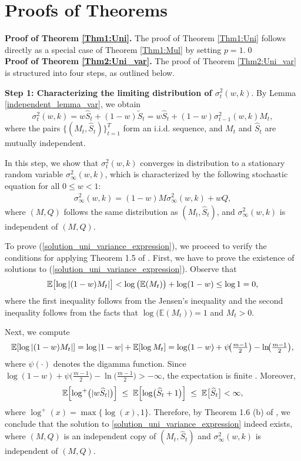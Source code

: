 \section{Proofs of Theorems}
\textbf{Proof of Theorem \ref{Thm1:Uni}.} The proof of Theorem \ref{Thm1:Uni} follows directly as a special case of Theorem \ref{Thm1:Mul} by setting $p=1$.\qed \\

\noindent
\textbf{Proof of Theorem \ref{Thm2:Uni_var}.} The proof of Theorem \ref{Thm2:Uni_var} is structured into four steps, as outlined below.

\noindent
\textbf{Step 1: Characterizing the limiting distribution of $\sigma_t^2(w,k)$}. By Lemma \ref{independent_lemma_var}, we obtain 
\[
\sigma_t^2(w,k) = w\widehat{S}_t + (1-w)\widetilde{S}_t = w\widehat{S}_t + (1-w)\sigma_{t-1}^2(w,k) M_t,
\]
where the pairs \(\{(M_t, \widehat{S}_t)\}_{t=1}^{T}\) form an i.i.d. sequence, and \(M_t\) and \(\widehat{S}_t\) are mutually independent.




In this step, we show that \(\sigma_t^2(w,k)\) converges in distribution to a stationary random variable \(\sigma_\infty^2(w,k)\), which is characterized by the following stochastic equation for all \(0 \leq w < 1\):
\begin{align}
\label{solution_uni_variance_expression}
\sigma_\infty^2(w,k) = (1-w)M\sigma_\infty^2(w,k) +wQ,
\end{align}
where \((M, Q)\) follows the same distribution as \((M_t, \widehat{S}_t)\), and \(\sigma_\infty^2(w,k)\) is independent of \((M, Q)\).

To prove (\ref{solution_uni_variance_expression}), we proceed to verify the conditions for applying Theorem 1.5 of \cite{vervaat1979stochastic}. First, we have to prove the existence of solutions to (\ref{solution_uni_variance_expression}). Observe that
\[
\mathbb{E}\bigl[\log \left\lvert (1-w)M_t\right\rvert\bigr] 
< 
\log \big(\mathbb{E}(M_t)\big) + \log (1-w) 
\leq
\log 1 
=
0,
\]
where the first inequality follows from the Jensen's inequality and the second inequality follows from the facts that $\log \bigl(\mathbb{E}(M_t)\bigr)=1$ and $M_t >0$.

Next, we compute
\[
\mathbb{E}[\log \left\lvert (1-w)M_t\right\rvert] = \log \left\lvert 1-w\right\rvert + \mathbb{E}[\log M_t] = \log (1-w) + \psi\!\bigl(\tfrac{m-1}{2}\bigr)
-
\ln\!\bigl(\tfrac{m-1}{2}\bigr),
\]
where \(\psi(\cdot)\) denotes the digamma function. Since \(\log (1-w) + \psi\bigl(\tfrac{m-1}{2}\bigr) - \ln\bigl(\tfrac{m-1}{2}\bigr) > -\infty\), the expectation is finite \citep{lee1989bayesian}. Moreover,
\[
\mathbb{E}\Bigl[\log^{+}\bigl(|w\widehat{S}_t|\bigr)\Bigr]
\;\le\;
\mathbb{E}\Bigl[\log\bigl(\widehat{S}_t + 1\bigr)\Bigr]
\;\le\;
\mathbb{E}\bigl[\widehat{S}_t\bigr]<\infty,
\]
where $\log^+(x)=\max\{\log(x),1\}$. Therefore, by Theorem 1.6 (b) of \citet{vervaat1979stochastic}, we conclude that the solution to \eqref{solution_uni_variance_expression} indeed exists, where \((M,Q)\) is an independent copy of \((M_t,\widehat{S}_t)\) and \(\sigma_\infty^2(w,k)\) is independent of \((M, Q)\).


